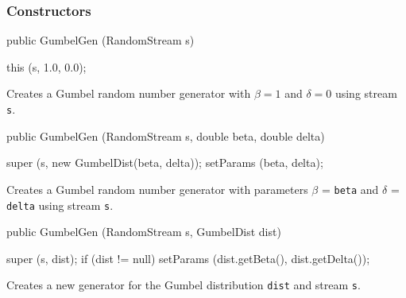 \subsubsection* {Constructors}
\begin{code}

   public GumbelGen (RandomStream s) \begin{hide} {
      this (s, 1.0, 0.0);
   }\end{hide}
\end{code}
\begin{tabb}  Creates a Gumbel random number generator with
  $\beta = 1$ and $\delta = 0$ using stream \texttt{s}.
\end{tabb}
\begin{code}

   public GumbelGen (RandomStream s, double beta, double delta) \begin{hide} {
      super (s, new GumbelDist(beta, delta));
      setParams (beta, delta);
   }\end{hide}
\end{code}
\begin{tabb}  Creates a Gumbel random number generator with parameters
$\beta$ = \texttt{beta} and $\delta$ = \texttt{delta} using stream \texttt{s}.
\end{tabb}
\begin{code}

   public GumbelGen (RandomStream s, GumbelDist dist) \begin{hide} {
      super (s, dist);
      if (dist != null)
         setParams (dist.getBeta(), dist.getDelta());
   } \end{hide}
\end{code}
 \begin{tabb}  Creates a new generator for the Gumbel distribution \texttt{dist}
   and stream \texttt{s}.
 \end{tabb}

